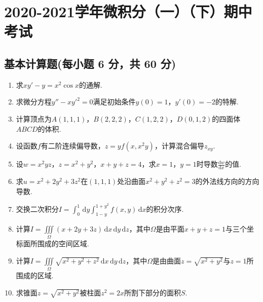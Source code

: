 \documentclass[../main.tex]{subfiles}
\begin{document}
\chapter{2020-2021学年微积分（一）（下）期中考试}

\section{基本计算题(每小题 6 分，共 60 分)}
\begin{enumerate}
    \item 求$xy'-y=x^{2}\cos x$的通解.
          \vspace{12em}

    \item 求微分方程$y''-xy'^{2}=0$满足初始条件$y(0)=1$，$y'(0)=-2$的特解.
          \vspace{12em}

    \item 计算顶点为$A(1,1,1)$，$B(2,2,2)$，$C(1,2,2)$，$D(0,1,2)$的四面体$ABCD$的体积.
          \vspace{12em}

    \item 设函数$f$有二阶连续偏导数，$z=yf\left(x,x^{2} y\right)$，计算混合偏导$z
                  _{xy}$.
          \vspace{13em}

    \item 设$w=x^{2} y z$，$z=x^{2}+y^{2}$，$x+y+z=4$，求$x=1$，$y=1$时导数$\frac{\mathrm{d}w}{\mathrm{d}x}$的值.
          \vspace{13em}

    \item 求$u=x^{2}+2y^{2}+3z^{2}$在$(1,1,1)$处沿曲面$x^{2}+y^{2}+z^{2}=3$的外法线方向的方向导数.
          \vspace{13em}

    \item 交换二次积分$I=\int_{0}^{1}\,\mathrm{d}y\int_{1-y}^{1+y^2}f(x,y)\,\mathrm{d}
              x$的积分次序.
          \vspace{13em}

    \item 计算$I=\iiint\limits_{\Omega}(x+2y+3z)\,\mathrm{d}x\,\mathrm{d}y\,\mathrm{d}z$，其中$\Omega$是由平面$x
              +y+z=1$与三个坐标面所围成的空间区域.
          \vspace{12em}

    \item 计算$I=\iiint\limits_{\Omega}\sqrt{x^{2}+y^{2}+z^{2}}\,\mathrm{d}x\,\mathrm{d}
              y\,\mathrm{d}z$，其中$\Omega$是由曲面$z=\sqrt{x^{2}+y^{2}}$与$z=1$所围成的区域.
          \vspace{12em}

    \item 求锥面$z=\sqrt{x^{2}+y^{2}}$被柱面$z^{2}=2x$所割下部分的面积$S$.
          \vspace{12em}
\end{enumerate}
\end{document}
